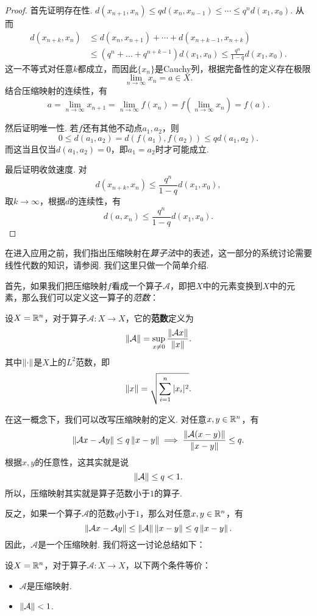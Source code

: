 \begin{proof}
首先证明存在性. $d(x_{n+1},x_n)\leq qd(x_n,x_{n-1})\leq \cdots\leq q^nd(x_1,x_0).$
从而
\begin{align*}
d(x_{n+k},x_n)&\leq d(x_n,x_{n+1})+\cdots+d(x_{n+k-1},x_{n+k})\\
&\leq(q^n+\dots+q^{n+k-1})d(x_1,x_0)\leq \frac{q^{n}}{1-q}d(x_1,x_0).
\end{align*}
这一不等式对任意$k$都成立，而因此$\{x_n\}$是Cauchy列，根据完备性的定义存在极限
\[\lim_{n\to\infty} x_n=a\in X.\]
结合压缩映射的连续性，有
\[a=\lim_{n\to\infty}x_{n+1} = \lim_{n\to\infty}f(x_n)=f\left(\lim_{n\to\infty}x_n\right)=f(a).\]

然后证明唯一性. 若$f$还有其他不动点$a_1,a_2$，则
\[0\leq d(a_1,a_2)=d(f(a_1),f(a_2))\leq qd(a_1,a_2).\]
而这当且仅当$d(a_1,a_2)=0$，即$a_1=a_2$时才可能成立.

最后证明收敛速度. 对
\[d(x_{n+k},x_n)\leq \frac{q^n}{1-q}d(x_1,x_0),\]
取$k\to\infty$，根据$d$的连续性，有
\[d(a,x_n)\leq \frac{q^n}{1-q}d(x_1,x_0).\]
\end{proof}

在进入应用之前，我们指出压缩映射在\textit{算子法}中的表述，这一部分的系统讨论需要线性代数的知识，请参阅. 我们这里只做一个简单介绍. 

首先，如果我们把压缩映射$f$看成一个算子$\mathcal A$，即把$X$中的元素变换到$X$中的元素，那么我们可以定义这一算子的\textit{范数}：

\begin{definition}[算子范数]
    设$X=\mathbb{R}^n$，对于算子$\mathcal A:X\to X$，它的\textbf{范数}定义为
    \[\left\|\mathcal A\right\|=\sup_{x\neq 0}\frac{\left\|\mathcal A x\right\|}{\left\|x\right\|}.\]
    其中$\left\|\cdot\right\|$是$X$上的$L^2$范数，即
    \[\left\|x\right\|=\sqrt{\sum_{i=1}^n|x_i|^2}.\]
\end{definition}

在这一概念下，我们可以改写压缩映射的定义. 对任意$x,y\in \mathbb{R}^n$，有
\[\left\|\mathcal A x-\mathcal A y\right\|\leq q\left\|x-y\right\|\implies \frac{\left\|\mathcal A(x-y)\right\|}{\left\|x-y\right\|}\leq q.\]
根据$x,y$的任意性，这其实就是说
\[\left\|\mathcal A\right\|\leq q<1.\]
所以，压缩映射其实就是算子范数小于$1$的算子. 

反之，如果一个算子$\mathcal A$的范数$q$小于$1$，那么对任意$x,y\in \mathbb{R}^n$，有
\[\left\|\mathcal A x-\mathcal A y\right\|\leq \left\|\mathcal A\right\|\left\|x-y\right\|\leq q\left\|x-y\right\|.\]
因此，$\mathcal A$是一个压缩映射. 我们将这一讨论总结如下：

\begin{theorem}\label{thm:operator-fixed-point}
    设$X=\mathbb{R}^n$，对于算子$\mathcal A:X\to X$，以下两个条件等价：
    \begin{itemize}
        \item $\mathcal A$是压缩映射.
        \item $\left\|\mathcal A\right\|<1$.
    \end{itemize}
\end{theorem}

